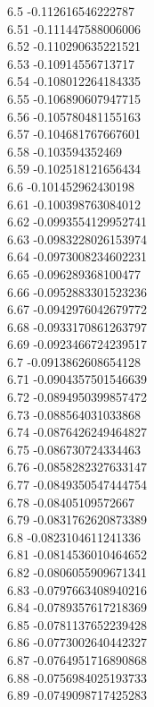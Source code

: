 {6.5	-0.112616546222787\\
6.51	-0.111447588006006\\
6.52	-0.110290635221521\\
6.53	-0.10914556713717\\
6.54	-0.108012264184335\\
6.55	-0.106890607947715\\
6.56	-0.105780481155163\\
6.57	-0.104681767667601\\
6.58	-0.103594352469\\
6.59	-0.102518121656434\\
6.6	-0.101452962430198\\
6.61	-0.100398763084012\\
6.62	-0.0993554129952741\\
6.63	-0.0983228026153974\\
6.64	-0.0973008234602231\\
6.65	-0.096289368100477\\
6.66	-0.0952883301523236\\
6.67	-0.0942976042679772\\
6.68	-0.0933170861263797\\
6.69	-0.0923466724239517\\
6.7	-0.0913862608654128\\
6.71	-0.0904357501546639\\
6.72	-0.0894950399857472\\
6.73	-0.088564031033868\\
6.74	-0.0876426249464827\\
6.75	-0.086730724334463\\
6.76	-0.0858282327633147\\
6.77	-0.0849350547444754\\
6.78	-0.08405109572667\\
6.79	-0.0831762620873389\\
6.8	-0.0823104611241336\\
6.81	-0.0814536010464652\\
6.82	-0.0806055909671341\\
6.83	-0.0797663408940216\\
6.84	-0.0789357617218369\\
6.85	-0.0781137652239428\\
6.86	-0.0773002640442327\\
6.87	-0.0764951716890868\\
6.88	-0.0756984025193733\\
6.89	-0.0749098717425283\\
}
